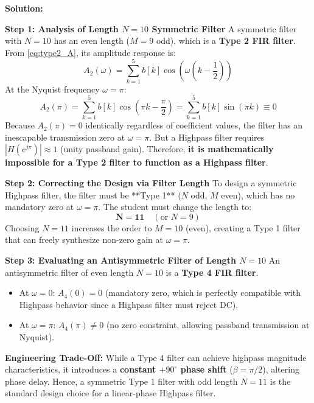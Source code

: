 \documentclass[11pt,a4paper]{article}
\begin{document}
\vspace{1mm}
\noindent\textbf{Solution:}

\noindent\textbf{Step 1: Analysis of Length $N = 10$ Symmetric Filter}
A symmetric filter with $N = 10$ has an even length ($M = 9$ odd), which is a \textbf{Type 2 FIR filter}.
From \eqref{eq:type2_A}, its amplitude response is:
\begin{equation}
A_2(\omega) = \sum_{k=1}^5 b[k] \cos\left(\omega\left(k - \frac{1}{2}\right)\right)
\end{equation}
At the Nyquist frequency $\omega = \pi$:
\begin{equation}
A_2(\pi) = \sum_{k=1}^5 b[k] \cos\left(\pi k - \frac{\pi}{2}\right) = \sum_{k=1}^5 b[k] \sin(\pi k) \equiv 0
\end{equation}
Because $A_2(\pi) = 0$ identically regardless of coefficient values, the filter has an inescapable transmission zero at $\omega = \pi$. But a Highpass filter requires $|H(e^{j\pi})| \approx 1$ (unity passband gain). Therefore, \textbf{it is mathematically impossible for a Type 2 filter to function as a Highpass filter}.

\vspace{1mm}
\noindent\textbf{Step 2: Correcting the Design via Filter Length}
To design a symmetric Highpass filter, the filter must be **Type 1** ($N$ odd, $M$ even), which has no mandatory zero at $\omega = \pi$.
The student must change the length to:
\begin{equation}
\mathbf{N = 11} \quad (\text{or } N = 9)
\end{equation}
Choosing $N = 11$ increases the order to $M = 10$ (even), creating a Type 1 filter that can freely synthesize non-zero gain at $\omega = \pi$.

\vspace{1mm}
\noindent\textbf{Step 3: Evaluating an Antisymmetric Filter of Length $N = 10$}
An antisymmetric filter of even length $N = 10$ is a \textbf{Type 4 FIR filter}.
\begin{itemize}
    \item At $\omega = 0$: $A_4(0) = 0$ (mandatory zero, which is perfectly compatible with Highpass behavior since a Highpass filter must reject DC).
    \item At $\omega = \pi$: $A_4(\pi) \ne 0$ (no zero constraint, allowing passband transmission at Nyquist).
\end{itemize}
\textbf{Engineering Trade-Off:} While a Type 4 filter can achieve highpass magnitude characteristics, it introduces a \textbf{constant $+90^\circ$ phase shift} ($\beta = \pi/2$), altering phase delay. Hence, a symmetric Type 1 filter with odd length $N = 11$ is the standard design choice for a linear-phase Highpass filter.
\end{document}
